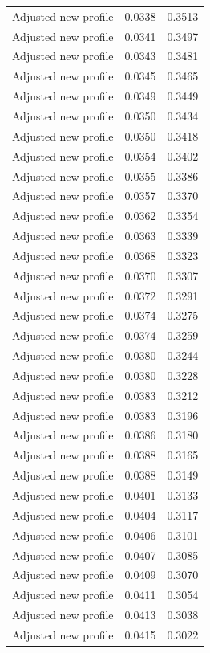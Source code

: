 \begin{table}[htbp]
\begin{tabular}{lll}
Adjusted new profile & 0.0338 & 0.3513 \\
Adjusted new profile & 0.0341 & 0.3497 \\
Adjusted new profile & 0.0343 & 0.3481 \\
Adjusted new profile & 0.0345 & 0.3465 \\
Adjusted new profile & 0.0349 & 0.3449 \\
Adjusted new profile & 0.0350 & 0.3434 \\
Adjusted new profile & 0.0350 & 0.3418 \\
Adjusted new profile & 0.0354 & 0.3402 \\
Adjusted new profile & 0.0355 & 0.3386 \\
Adjusted new profile & 0.0357 & 0.3370 \\
Adjusted new profile & 0.0362 & 0.3354 \\
Adjusted new profile & 0.0363 & 0.3339 \\
Adjusted new profile & 0.0368 & 0.3323 \\
Adjusted new profile & 0.0370 & 0.3307 \\
Adjusted new profile & 0.0372 & 0.3291 \\
Adjusted new profile & 0.0374 & 0.3275 \\
Adjusted new profile & 0.0374 & 0.3259 \\
Adjusted new profile & 0.0380 & 0.3244 \\
Adjusted new profile & 0.0380 & 0.3228 \\
Adjusted new profile & 0.0383 & 0.3212 \\
Adjusted new profile & 0.0383 & 0.3196 \\
Adjusted new profile & 0.0386 & 0.3180 \\
Adjusted new profile & 0.0388 & 0.3165 \\
Adjusted new profile & 0.0388 & 0.3149 \\
Adjusted new profile & 0.0401 & 0.3133 \\
Adjusted new profile & 0.0404 & 0.3117 \\
Adjusted new profile & 0.0406 & 0.3101 \\
Adjusted new profile & 0.0407 & 0.3085 \\
Adjusted new profile & 0.0409 & 0.3070 \\
Adjusted new profile & 0.0411 & 0.3054 \\
Adjusted new profile & 0.0413 & 0.3038 \\
Adjusted new profile & 0.0415 & 0.3022 \\

\end{tabular}
\end{table}
